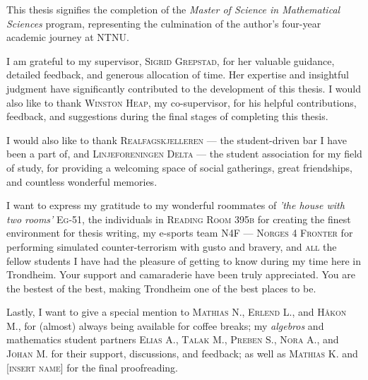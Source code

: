 




\vspace{.25in}

This thesis signifies the completion of the \textit{Master of Science in Mathematical Sciences} program, representing the culmination of the author's four-year academic journey at NTNU.

I am grateful to my supervisor, \textsc{Sigrid Grepstad}, for her valuable guidance, detailed feedback, and generous allocation of time. Her expertise and insightful judgment have significantly contributed to the development of this thesis. I would also like to thank \textsc{Winston Heap}, my co-supervisor, for his helpful contributions, feedback, and suggestions during the final stages of completing this thesis.

I would also like to thank \textsc{Realfagskjelleren} — the student-driven bar I have been a part of, and \textsc{Linjeforeningen Delta} — the student association for my field of study, for providing a welcoming space of social gatherings, great friendships, and countless wonderful memories. 

I want to express my gratitude to my wonderful roommates of \emph{'the house with two rooms'} \textsc{Eg-51}, the individuals in \textsc{Reading Room 395b} for creating the finest environment for thesis writing, my e-sports team \textsc{N4F — Norges 4 Fronter} for performing simulated counter-terrorism with gusto and bravery, and \textsc{all} the fellow students I have had the pleasure of getting to know during my time here in Trondheim. Your support and camaraderie have been truly appreciated. You are the bestest of the best, making Trondheim one of the best places to be. 

Lastly, I want to give a special mention to \textsc{Mathias N.}, \textsc{Erlend L.}, and \textsc{Håkon M.}, for (almost) always being available for coffee breaks; my \emph{algebros} and mathematics student partners \textsc{Elias A.}, \textsc{Talak M.}, \textsc{Preben S.}, \textsc{Nora A.}, and \textsc{Johan M.} for their support, discussions, and feedback; as well as \textsc{Mathias K.} and \textsc{[insert name]} for the final proofreading.


